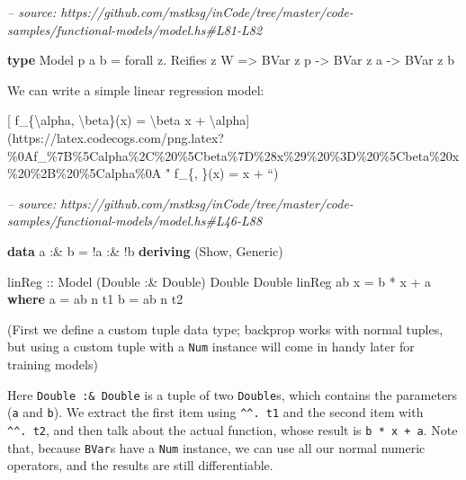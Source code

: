 \documentclass[]{article}
\newenvironment{Shaded}{}{}
\newcommand{\CommentTok}[1]{\textcolor[rgb]{0.38,0.63,0.69}{\textit{#1}}}
\newcommand{\DataTypeTok}[1]{\textcolor[rgb]{0.56,0.13,0.00}{#1}}
\newcommand{\FunctionTok}[1]{\textcolor[rgb]{0.02,0.16,0.49}{#1}}
\newcommand{\KeywordTok}[1]{\textcolor[rgb]{0.00,0.44,0.13}{\textbf{#1}}}
\newcommand{\NormalTok}[1]{#1}
\newcommand{\OtherTok}[1]{\textcolor[rgb]{0.00,0.44,0.13}{#1}}
\begin{document}
\begin{Shaded}
\begin{Highlighting}[]
\CommentTok{-- source: https://github.com/mstksg/inCode/tree/master/code-samples/functional-models/model.hs#L81-L82}

\KeywordTok{type} \DataTypeTok{Model}\NormalTok{ p a b }\FunctionTok{=}\NormalTok{ forall z}\FunctionTok{.} \DataTypeTok{Reifies}\NormalTok{ z }\DataTypeTok{W}
                \OtherTok{=>} \DataTypeTok{BVar}\NormalTok{ z p }\OtherTok{->} \DataTypeTok{BVar}\NormalTok{ z a }\OtherTok{->} \DataTypeTok{BVar}\NormalTok{ z b}
\end{Highlighting}
\end{Shaded}

We can write a simple linear regression model:

{[} f\_\{\textbackslash{}alpha, \textbackslash{}beta\}(x) = \textbackslash{}beta
x +
\textbackslash{}alpha{]}(https://latex.codecogs.com/png.latex?\%0Af\_\%7B\%5Calpha\%2C\%20\%5Cbeta\%7D\%28x\%29\%20\%3D\%20\%5Cbeta\%20x\%20\%2B\%20\%5Calpha\%0A
" f\_\{\alpha, \beta\}(x) = \beta x + \alpha ``)

\begin{Shaded}
\begin{Highlighting}[]
\CommentTok{-- source: https://github.com/mstksg/inCode/tree/master/code-samples/functional-models/model.hs#L46-L88}

\KeywordTok{data}\NormalTok{ a }\FunctionTok{:&}\NormalTok{ b }\FunctionTok{=} \FunctionTok{!}\NormalTok{a }\FunctionTok{:&} \FunctionTok{!}\NormalTok{b}
  \KeywordTok{deriving}\NormalTok{ (}\DataTypeTok{Show}\NormalTok{, }\DataTypeTok{Generic}\NormalTok{)}

\OtherTok{linReg ::} \DataTypeTok{Model}\NormalTok{ (}\DataTypeTok{Double} \FunctionTok{:&} \DataTypeTok{Double}\NormalTok{) }\DataTypeTok{Double} \DataTypeTok{Double}
\NormalTok{linReg ab x }\FunctionTok{=}\NormalTok{ b }\FunctionTok{*}\NormalTok{ x }\FunctionTok{+}\NormalTok{ a}
  \KeywordTok{where}
\NormalTok{    a }\FunctionTok{=}\NormalTok{ ab }\FunctionTok{^^.}\NormalTok{ t1}
\NormalTok{    b }\FunctionTok{=}\NormalTok{ ab }\FunctionTok{^^.}\NormalTok{ t2}
\end{Highlighting}
\end{Shaded}

(First we define a custom tuple data type; backprop works with normal tuples,
but using a custom tuple with a \texttt{Num} instance will come in handy later
for training models)

Here \texttt{Double\ :\&\ Double} is a tuple of two \texttt{Double}s, which
contains the parameters (\texttt{a} and \texttt{b}). We extract the first item
using \texttt{\^{}\^{}.\ t1} and the second item with \texttt{\^{}\^{}.\ t2},
and then talk about the actual function, whose result is \texttt{b\ *\ x\ +\ a}.
Note that, because \texttt{BVar}s have a \texttt{Num} instance, we can use all
our normal numeric operators, and the results are still differentiable.
\end{document}
